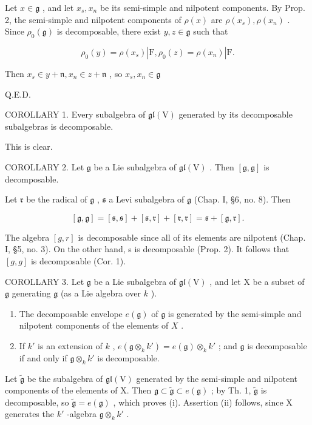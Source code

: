 Let \(x \in \mathfrak{g}\) , and let \(x_s, x_n\) be its semi-simple and nilpotent components. By Prop. 2, the semi-simple and nilpotent components of \(\rho(x)\) are \(\rho(x_s), \rho(x_n)\) . Since \(\rho_0(\mathfrak{g})\) is decomposable, there exist \(y, z \in \mathfrak{g}\) such that

\[
\rho_ {0} (y) = \rho (x _ {s}) | \mathrm{F}, \rho_ {0} (z) = \rho (x _ {n}) | \mathrm{F}.
\]

Then \(x_{s}\in y + \mathfrak{n},x_{n}\in z + \mathfrak{n}\) , so \(x_{s},x_{n}\in \mathfrak{g}\)

Q.E.D.

COROLLARY 1. Every subalgebra of \(\mathfrak{gl}(\mathrm{V})\) generated by its decomposable subalgebras is decomposable.

This is clear.

COROLLARY 2. Let \(\mathfrak{g}\) be a Lie subalgebra of \(\mathfrak{gl}(\mathrm{V})\) . Then \([\mathfrak{g},\mathfrak{g}]\) is decomposable.

Let \(\mathfrak{r}\) be the radical of \(\mathfrak{g}\) , \(\mathfrak{s}\) a Levi subalgebra of \(\mathfrak{g}\) (Chap. I, §6, no. 8). Then

\[
[ \mathfrak {g}, \mathfrak {g} ] = [ \mathfrak {s}, \mathfrak {s} ] + [ \mathfrak {s}, \mathfrak {r} ] + [ \mathfrak {r}, \mathfrak {r} ] = \mathfrak {s} + [ \mathfrak {g}, \mathfrak {r} ].
\]

The algebra \([g,r]\) is decomposable since all of its elements are nilpotent (Chap. I, §5, no. 3). On the other hand, s is decomposable (Prop. 2). It follows that \([g,g]\) is decomposable (Cor. 1).

COROLLARY 3. Let \(\mathfrak{g}\) be a Lie subalgebra of \(\mathfrak{gl}(\mathrm{V})\) , and let \(\mathrm{X}\) be a subset of \(\mathfrak{g}\) generating \(\mathfrak{g}\) (as a Lie algebra over \(k\) ).

\begin{enumerate}
\def\labelenumi{(\roman{enumi})}
\item
  The decomposable envelope \(e(\mathfrak{g})\) of \(\mathfrak{g}\) is generated by the semi-simple and nilpotent components of the elements of \(X\) .
\item
  If \(k'\) is an extension of \(k\) , \(e(\mathfrak{g} \otimes_k k') = e(\mathfrak{g}) \otimes_k k'\) ; and \(\mathfrak{g}\) is decomposable if and only if \(\mathfrak{g} \otimes_k k'\) is decomposable.
\end{enumerate}

Let \(\tilde{\mathfrak{g}}\) be the subalgebra of \(\mathfrak{gl}(\mathrm{V})\) generated by the semi-simple and nilpotent components of the elements of X. Then \(\mathfrak{g} \subset \tilde{\mathfrak{g}} \subset e(\mathfrak{g})\) ; by Th. 1, \(\tilde{\mathfrak{g}}\) is decomposable, so \(\tilde{\mathfrak{g}} = e(\mathfrak{g})\) , which proves (i). Assertion (ii) follows, since X generates the \(k'\) -algebra \(\mathfrak{g} \otimes_k k'\) .

